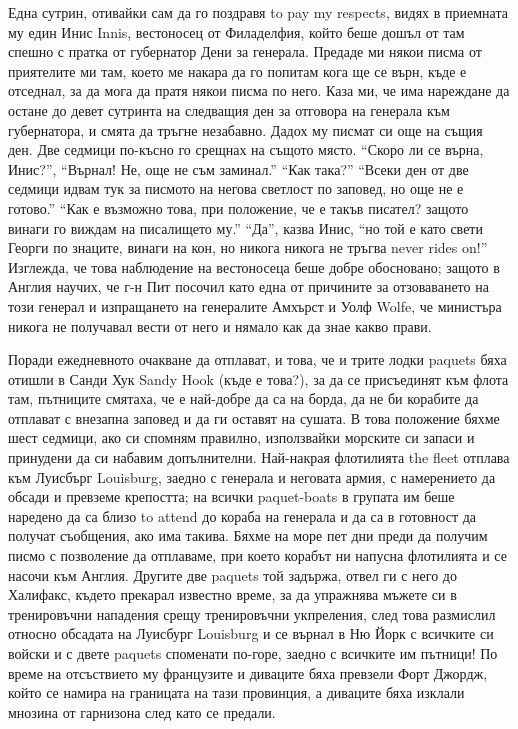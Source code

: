 \documentclass[12pt]{book}
\begin{document}
Една сутрин, отивайки сам да го поздравя to pay my respects, видях в приемната му един Инис Innis, вестоносец от Филаделфия, който беше дошъл от там спешно с пратка от губернатор Дени за генерала. Предаде ми някои писма от приятелите ми там, което ме накара да го попитам кога ще се върн, къде е отседнал, за да мога да пратя някои писма по него. Каза ми, че има нареждане да остане до девет сутринта на следващия ден за отговора на генерала към губернатора, и смята да тръгне незабавно. Дадох му писмат си още на същия ден. Две седмици по-късно го срещнах на същото място. “Скоро ли се върна, Инис?”, “Върнал! Не, още не съм заминал.” “Как така?” “Всеки ден от две седмици идвам тук за писмото на негова светлост по заповед, но още не е готово.” “Как е възможно това, при положение, че е такъв писател? защото винаги го виждам на писалището му.” “Да”, казва Инис, “но той е като свети Георги по знаците, винаги на кон, но никога никога не тръгва never rides on!” Изглежда, че това наблюдение на вестоносеца беше добре обосновано; защото в Англия научих, че г-н Пит посочил като една от причините за отзоваването на този генерал и изпращането на генералите Амхърст и Уолф Wolfe, че министъра никога не получавал вести от него и нямало как да знае какво прави.

Поради ежедневното очакване да отплават, и това, че и трите лодки paquets бяха отишли в Санди Хук Sandy Hook (къде е това?), за да се присъединят към флота там, пътниците смятаха, че е най-добре да са на борда, да не би корабите да отплават с внезапна заповед и да ги оставят на сушата. В това положение бяхме шест седмици, ако си спомням правилно, използвайки морските си запаси и принудени да си набавим допълнителни. Най-накрая флотилията the fleet отплава към Луисбърг Louisburg, заедно с генерала и неговата армия, с намерението да обсади и превземе крепостта; на всички paquet-boats в групата им беше наредено да са близо to attend до кораба на генерала и да са в готовност да получат съобщения, ако има такива. Бяхме на море пет дни преди да получим писмо с позволение да отплаваме, при което корабът ни напусна флотилията и се насочи към Англия. Другите две paquets той задържа, отвел ги с него до Халифакс, където прекарал известно време, за да упражнява мъжете си в тренировъчни нападения срещу тренировъчни укпреления, след това размислил относно обсадата на Луисбург Louisburg и се върнал в Ню Йорк с всичките си войски и с двете paquets споменати по-горе, заедно с всичките им пътници! По време на отсъствието му французите и диваците бяха превзели Форт Джордж, който се намира на границата на тази провинция, а диваците бяха изклали мнозина от гарнизона след като се предали. 
\end{document}

